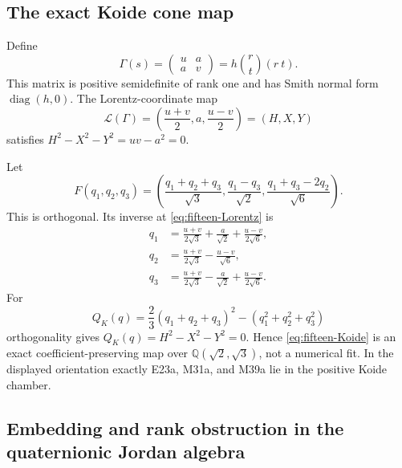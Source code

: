 \subsection{The exact Koide cone map}

Define
\begin{equation}
 \Gamma(s)=\begin{pmatrix}u&a\\a&v\end{pmatrix}
 =h\binom rt(r\ t).
 \label{eq:fifteen-Gamma}
\end{equation}
This matrix is positive semidefinite of rank one and has Smith normal form
$\operatorname{diag}(h,0)$.  The Lorentz-coordinate map
\begin{equation}
 \mathcal L(\Gamma)=
 \left(\frac{u+v}{2},a,\frac{u-v}{2}\right)=(H,X,Y)
 \label{eq:fifteen-Lorentz}
\end{equation}
satisfies $H^2-X^2-Y^2=uv-a^2=0$.

Let
\[
 F(q_1,q_2,q_3)=
 \left(\frac{q_1+q_2+q_3}{\sqrt3},
       \frac{q_1-q_3}{\sqrt2},
       \frac{q_1+q_3-2q_2}{\sqrt6}\right).
\]
This is orthogonal.  Its inverse at \eqref{eq:fifteen-Lorentz} is
\begin{align}
 q_1&=\frac{u+v}{2\sqrt3}+\frac a{\sqrt2}
                         +\frac{u-v}{2\sqrt6},\nonumber\\
 q_2&=\frac{u+v}{2\sqrt3}-\frac{u-v}{\sqrt6},\label{eq:fifteen-Koide}\\
 q_3&=\frac{u+v}{2\sqrt3}-\frac a{\sqrt2}
                         +\frac{u-v}{2\sqrt6}.\nonumber
\end{align}
For
\[
 Q_K(q)=\frac23(q_1+q_2+q_3)^2-(q_1^2+q_2^2+q_3^2)
\]
orthogonality gives $Q_K(q)=H^2-X^2-Y^2=0$.  Hence
\eqref{eq:fifteen-Koide} is an exact coefficient-preserving map over
$\mathbb Q(\sqrt2,\sqrt3)$, not a numerical fit.  In the displayed
orientation exactly E23a, M31a, and M39a lie in the positive Koide chamber.

\subsection{Embedding and rank obstruction in the quaternionic Jordan algebra}

